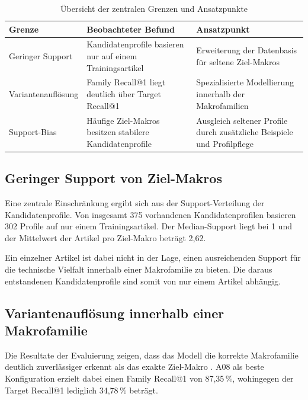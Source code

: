 \begin{table}[H]
	\centering
	\setlength{\tabcolsep}{4pt}
	\renewcommand{\arraystretch}{1.1}
	\caption{Übersicht der zentralen Grenzen und Ansatzpunkte}
	\label{tab:grenzen_uebersicht}
	\begin{tabularx}{\textwidth}{>{\raggedright\arraybackslash}p{3.5cm} >{\raggedright\arraybackslash}p{4.0cm} >{\raggedright\arraybackslash}X}
		\toprule
		\textbf{Grenze} & \textbf{Beobachteter Befund} & \textbf{Ansatzpunkt} \\
		\midrule
		Geringer Support & 302 Kandidatenprofile basieren nur auf einem Trainingsartikel & Erweiterung der Datenbasis für seltene Ziel-Makros \\
		Variantenauflösung & Family Recall@1 liegt deutlich über Target Recall@1 & Spezialisierte Modellierung innerhalb der Makrofamilien \\
		Support-Bias & Häufige Ziel-Makros besitzen stabilere Kandidatenprofile & Ausgleich seltener Profile durch zusätzliche Beispiele und Profilpflege \\
		\bottomrule
	\end{tabularx}
\end{table}

\subsection{Geringer Support von Ziel-Makros}

Eine zentrale Einschränkung ergibt sich aus der Support-Verteilung der Kandidatenprofile. Von insgesamt 375 vorhandenen Kandidatenprofilen basieren 302 Profile auf nur einem Trainingsartikel.
Der Median-Support liegt bei 1 und der Mittelwert der Artikel pro Ziel-Makro \parencite{EPLAN-Makros} beträgt 2,62.

Ein einzelner Artikel ist dabei nicht in der Lage, einen ausreichenden Support für die technische Vielfalt innerhalb einer Makrofamilie zu bieten.
Die daraus entstandenen Kandidatenprofile sind somit von nur einem Artikel abhängig.

\subsection{Variantenauflösung innerhalb einer Makrofamilie}

Die Resultate der Evaluierung zeigen, dass das Modell die korrekte Makrofamilie deutlich zuverlässiger erkennt als das exakte Ziel-Makro \parencite{EPLAN-Makros}.
A08 als beste Konfiguration erzielt dabei einen Family Recall@1 von 87,35\,\%, wohingegen der Target Recall@1 lediglich 34,78\,\% beträgt.

